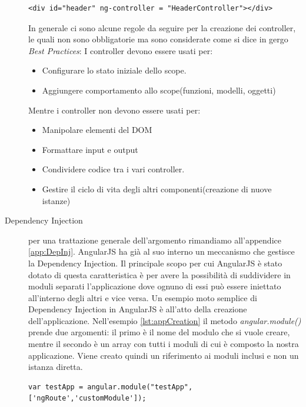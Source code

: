 \begin{description}
\begin{lstlisting}[caption={Associazione tra un elemento del DOM e un controller}, label={lst:newController}]
	<div id="header" ng-controller = "HeaderController"></div>
\end{lstlisting}
In generale ci sono alcune regole da seguire per la creazione dei controller, le quali non sono obbligatorie ma sono considerate come si dice in gergo \emph{Best Practices}:
I controller devono essere usati per:
\begin{itemize}
\item Configurare lo stato iniziale dello scope.
\item Aggiungere comportamento allo scope(funzioni, modelli, oggetti)
\end{itemize}
Mentre i controller non devono essere usati per:
\begin{itemize}
\item Manipolare elementi del DOM
\item Formattare input e output
\item Condividere codice tra i vari controller.
\item Gestire il ciclo di vita degli altri componenti(creazione di nuove istanze)
\end{itemize}

\item[Dependency Injection] per una trattazione generale dell'argomento rimandiamo all'appendice \ref{app:DepInj}. AngularJS ha già al suo interno un meccanismo che gestisce la Dependency Injection. Il principale scopo per cui AngularJS è stato dotato di questa caratteristica è per avere la possibilità di suddividere in moduli separati l'applicazione dove ognuno di essi può essere iniettato all'interno degli altri e vice versa. Un esempio moto semplice di Dependency Injection in AngularJS è all'atto della creazione dell'applicazione. Nell'esempio \ref{lst:appCreation} il metodo \textit{angular.module()} prende due argomenti: il primo è il nome del modulo che si vuole creare, mentre il secondo è un array con tutti i moduli di cui è composto la nostra applicazione. Viene creato quindi un riferimento ai moduli inclusi e non un istanza diretta.  
\begin{lstlisting}[caption = {\\Creazione di una applicazione in AngularJS con le relative dipendenze}, 
				   label = {lst:appCreation}]
	var testApp = angular.module("testApp",['ngRoute','customModule']);
\end{lstlisting}


\end{description}
